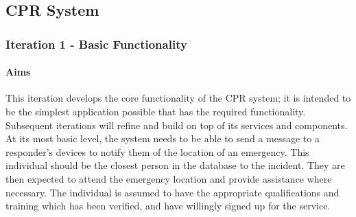 \documentclass{article}
\begin{document}
\pagebreak
	\subsection{CPR System}
		\subsubsection{Iteration 1 - Basic Functionality}
			\paragraph{Aims}
			This iteration develops the core functionality of the CPR system; it is intended to be the simplest application possible that has the required functionality. Subsequent iterations will refine and build on top of its services and components.\\

At its most basic level, the system needs to be able to send a message to a responder’s devices to notify them of the location of an emergency. This individual should be the closest person in the database to the incident. They are then expected to attend the emergency location and provide assistance where necessary. The individual is assumed to have the appropriate qualifications and training which has been verified, and have willingly signed up for the service.\\
\end{document}
